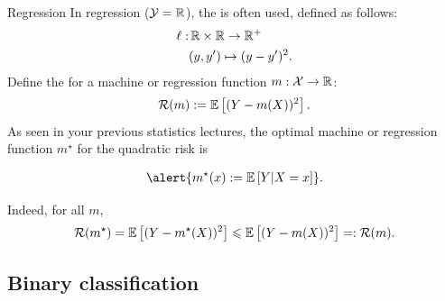 \documentclass[xcolor={usenames,dvipsnames},handout]{beamer}
\begin{document}
\begin{frame}{Regression}
In regression (${\mathcal{Y}} = \mathbb{R}$), the  is often used, defined as follows:
\begin{align*}
\ell :  & \, \mathbb{R} \times \mathbb{R} \to \mathbb{R}^+ \\
& (y,y') \mapsto (y-y')^2.
\end{align*}
Define the  for a machine or regression function $m :{\mathcal{X}} \to \mathbb{R}$:
\begin{align*}
{\mathcal{R}}(m) := \mathbb{E} \left[ (Y-m(X) )^2 \right].
\end{align*}
As seen in your previous statistics lectures, the optimal machine or regression function $m^\star$ for the quadratic risk is 

\begin{align*}
\alert{m^\star(x) := \E \left[ Y | X=x \right]}.
\end{align*}

Indeed, for all $m$,
$$
{\mathcal{R}}(m^\star) = \mathbb{E} \left[ (Y-m^\star(X) )^2 \right] \leqslant \mathbb{E} \left[ (Y-m(X) )^2 \right] =: {\mathcal{R}}(m).
$$
\end{frame}

%
%



\subsection{Binary classification}
\end{document}
